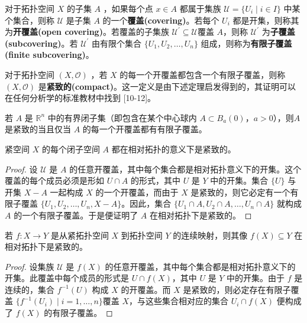 对于拓扑空间 $X$ 的子集 $A$ ，如果每个点 $x\in A$ 都属于集族 $\mathcal{U} =\{U_{i} \mid i\in I\}$ 中某个集合，则称 $\mathcal{U}$ 是子集 $A$ 的一个\textbf{覆盖(covering)}。若每个 $U_{i}$ 都是开集，则称其为\textbf{开覆盖(open covering)}。若覆盖的子集族 $\mathcal{U} ^{\prime}\subseteq \mathcal{U}$覆盖 $A$，则称 $\mathcal{U} ^{\prime}$ 为\textbf{子覆盖(subcovering)}。若 $\mathcal{U} ^{\prime}$ 由有限个集合 $\{U_{1} ,U_{2} ,\dotsc ,U_{n} \}$ 组成，则称为\textbf{有限子覆盖(finite subcovering)}。

	对于拓扑空间 $(X,\mathcal{O} )$ ，若 $X$ 的每一个开覆盖都包含一个有限子覆盖，则称 $(X,\mathcal{O} )$ 是\textbf{紧致的(compact)}。这一定义是由下述定理启发得到的，其证明可以在任何分析学的标准教材中找到 [10-12]。

\begin{theorem}[海涅-博雷尔定理]\label{thm:10.8} 
	若 $A$ 是 $\mathbb{R}^{n}$ 中的有界闭子集（即包含在某个中心球内 $A\subset B_{a} (0)$，$a >0$），则$A$ 是紧致的当且仅当 $A$ 的每一个开覆盖都有有限子覆盖。
\end{theorem}

\begin{theorem}\label{thm:10.9} 
	紧空间 $X$ 的每个闭子空间 $A$ 都在相对拓扑的意义下是紧致的。
\end{theorem}

\begin{proof}
	设 $\mathcal{U}$ 是 $A$ 的任意开覆盖，其中每个集合都是相对拓扑意义下的开集。这个覆盖的每个成员必须是形如 $U\cap A$ 的形式，其中 $U$ 是 $Y$ 中的开集。集合 $\{U\}$ 与开集 $X-A$ 一起构成 $X$ 的一个开覆盖，而由于 $X$ 是紧致的，则它必定有一个有限子覆盖 $\{U_{1} ,U_{2} ,\dotsc ,U_{n} ,X-A\}$。因此，集合 $\{U_{1} \cap A,U_{2} \cap A,\dotsc ,U_{n} \cap A\}$ 就构成 $A$ 的一个有限子覆盖。于是便证明了 $A$ 在相对拓扑下是紧致的。
\end{proof}

\begin{theorem}\label{thm:10.10} 
	若 $f:X\rightarrow Y$ 是从紧拓扑空间 $X$ 到拓扑空间 $Y$ 的连续映射，则其像 $f(X)\subseteq Y$ 在相对拓扑下是紧致的。
\end{theorem}

\begin{proof}
	设集族 $\mathcal{U}$ 是 $f(X)$ 的任意开覆盖，其中每个集合都是相对拓扑意义下的开集。此覆盖中每个成员的形式是 $U\cap f(X)$，其中 $U$ 是 $Y$ 中的开集。由于 $f$ 是连续的，集合 $f^{-1} (U)$ 构成 $X$ 的开覆盖。而 $X$ 是紧致的，则必定存在有限子覆盖 $\{f^{-1} (U_{i} )\mid i=1,\dotsc ,n\}$覆盖 $X$，与这些集合相对应的集合 $U_{i} \cap f(X)$ 便构成了 $f(X)$ 的有限子覆盖。
\end{proof}


